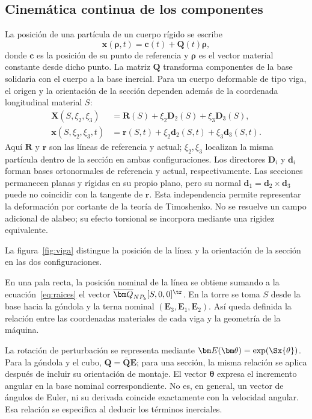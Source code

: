 \subsection{Cinemática continua de los componentes}
La posición de una partícula de un cuerpo rígido se escribe
\begin{equation}
\bm x(\bm\rho,t)=\bm c(t)+\bm Q(t)\bm\rho,
\label{eq:cuerpo-rigido}
\end{equation}
donde $\bm c$ es la posición de su punto de referencia y $\bm\rho$ es el vector material constante desde dicho punto. La matriz $\bm Q$ transforma componentes de la base solidaria con el cuerpo a la base inercial. Para un cuerpo deformable de tipo viga, el origen y la orientación de la sección dependen además de la coordenada longitudinal material $S$:
\begin{align}
\bm X(S,\xi_2,\xi_3)
&=\bm R(S)+\xi_2\bm D_2(S)+\xi_3\bm D_3(S),\nonumber\\
\bm x(S,\xi_2,\xi_3,t)
&=\bm r(S,t)+\xi_2\bm d_2(S,t)+\xi_3\bm d_3(S,t).
\label{eq:viga-continua}
\end{align}
Aquí $\bm R$ y $\bm r$ son las líneas de referencia y actual; $\xi_2,\xi_3$ localizan la misma partícula dentro de la sección en ambas configuraciones. Los directores $\bm D_i$ y $\bm d_i$ forman bases ortonormales de referencia y actual, respectivamente. Las secciones permanecen planas y rígidas en su propio plano, pero su normal $\bm d_1=\bm d_2\times\bm d_3$ puede no coincidir con la tangente de $\bm r$. Esta independencia permite representar la deformación por cortante de la teoría de Timoshenko. No se resuelve un campo adicional de alabeo; su efecto torsional se incorpora mediante una rigidez equivalente.

La figura~\ref{fig:viga} distingue la posición de la línea y la orientación de la sección en las dos configuraciones.




En una pala recta, la posición nominal de la línea se obtiene sumando a la ecuación~\eqref{eq:raices} el vector $\overline{\bm Q}_{NP_b}[S,0,0]^\tr$. En la torre se toma $S$ desde la base hacia la góndola y la terna nominal $(\bm E_3,\bm E_1,\bm E_2)$. Así queda definida la relación entre las coordenadas materiales de cada viga y la geometría de la máquina.

La rotación de perturbación se representa mediante
$\bm E(\bm\theta)=\exp(\Sx{\theta})$.
Para la góndola y el cubo, $\bm Q=\overline{\bm Q}\bm E$; para una sección, la misma relación se aplica después de incluir su orientación de montaje. El vector $\bm\theta$ expresa el incremento angular en la base nominal correspondiente. No es, en general, un vector de ángulos de Euler, ni su derivada coincide exactamente con la velocidad angular. Esa relación se especifica al deducir los términos inerciales.

